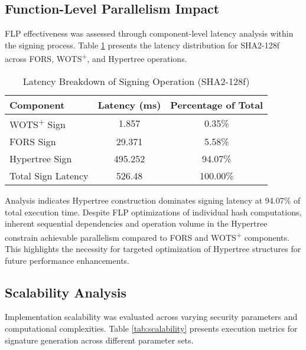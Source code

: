 \documentclass[journal]{IEEEtran}
\begin{document}
\subsection{Function-Level Parallelism Impact}

FLP effectiveness was assessed through component-level latency analysis within the signing process. Table \ref{tab:flp_impact} presents the latency distribution for SHA2-128f across FORS, WOTS\textsuperscript{+}, and Hypertree operations.

\begin{table}[h]
  \centering
  \caption{Latency Breakdown of Signing Operation (SHA2-128f)}
  \label{tab:flp_impact}
  \begin{tabular}{@{}lcc@{}}
    \toprule
    \textbf{Component} & \textbf{Latency (ms)} & \textbf{Percentage of Total} \\
    \midrule
    WOTS\textsuperscript{+} Sign & 1.857 & 0.35\% \\
    FORS Sign & 29.371 & 5.58\% \\
    Hypertree Sign & 495.252 & 94.07\% \\
    \midrule
    Total Sign Latency & 526.48 & 100.00\% \\
    \bottomrule
  \end{tabular}
\end{table}

Analysis indicates Hypertree construction dominates signing latency at 94.07\% of total execution time. Despite FLP optimizations of individual hash computations, inherent sequential dependencies and operation volume in the Hypertree constrain achievable parallelism compared to FORS and WOTS\textsuperscript{+} components. This highlights the necessity for targeted optimization of Hypertree structures for future performance enhancements.
\subsection{Scalability Analysis}

Implementation scalability was evaluated across varying security parameters and computational complexities. Table \ref{tab:scalability} presents execution metrics for signature generation across different parameter sets.
\end{document}
